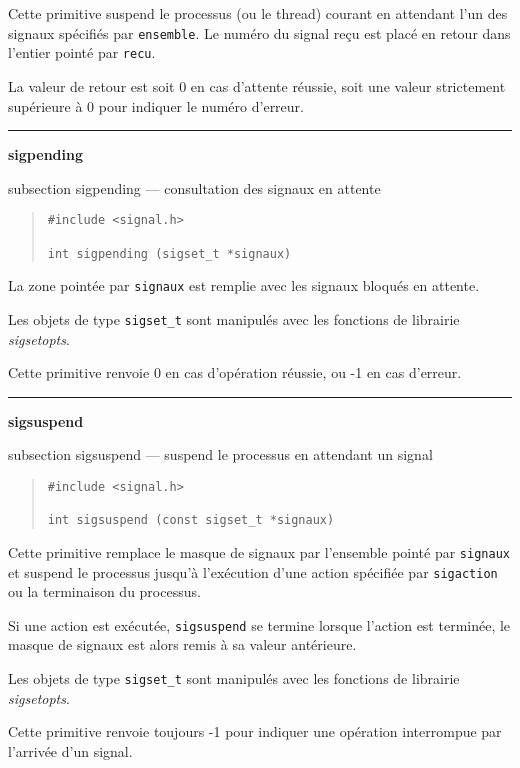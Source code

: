 \documentclass [twoside] {report}
\newcommand {\primitive} [1]
    {
	\phantomsection
	{\large \bf #1}
	\addcontentsline {toc} {subsection} {#1}
    }
\newcommand {\separation}
    {
	\vspace {5mm}
	\nopagebreak
	\hrule
    }
\begin{document}
Cette primitive suspend le processus (ou le thread) courant en attendant
l'un des signaux spécifiés par \texttt {ensemble}. Le numéro du signal
reçu est placé en retour dans l'entier pointé par \texttt {recu}.

La valeur de retour est soit 0 en cas d'attente réussie, soit une valeur
strictement supérieure à 0 pour indiquer le numéro d'erreur.


\separation
\primitive {sigpending} --- consultation des signaux en attente

\begin {quote}
\begin {verbatim}
#include <signal.h>

int sigpending (sigset_t *signaux)
\end{verbatim}
\end {quote}

La zone pointée par {\tt signaux} est remplie avec les signaux bloqués
en attente.

Les objets de type {\tt sigset\_t} sont manipulés avec les fonctions de
librairie {\em sigsetopts}.

Cette primitive renvoie 0 en cas d'opération réussie, ou -1 en cas
d'erreur.



\separation
\primitive {sigsuspend} --- suspend le processus en attendant un signal

\begin {quote}
\begin {verbatim}
#include <signal.h>

int sigsuspend (const sigset_t *signaux)
\end{verbatim}
\end {quote}

Cette primitive remplace le masque de signaux par l'ensemble pointé par
{\tt signaux} et suspend le processus jusqu'à l'exécution d'une action
spécifiée par {\tt sigaction} ou la terminaison du processus.

Si une action est exécutée, {\tt sigsuspend} se termine lorsque l'action
est terminée, le masque de signaux est alors remis à sa valeur
antérieure.

Les objets de type {\tt sigset\_t} sont manipulés avec les fonctions de
librairie {\em sigsetopts}.

Cette primitive renvoie toujours -1 pour indiquer une opération
interrompue par l'arrivée d'un signal.


\end{document}
